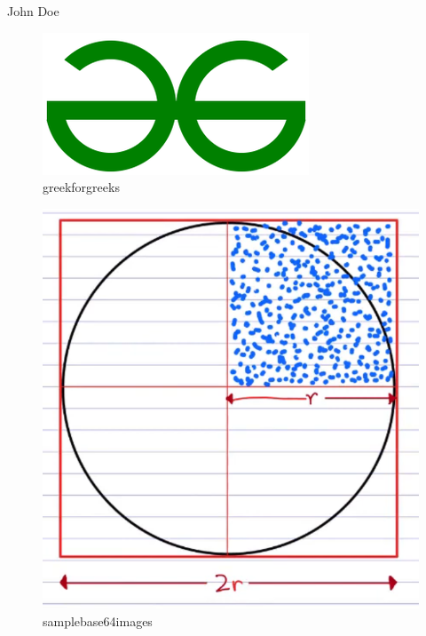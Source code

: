 \documentclass[journal,lettersize]{IEEEtran}%
\begin{document}
\begin{IEEEbiographynophoto}{John Doe}
    \begin{figure}[!t] 
    \centerline{\includegraphics[width=\linewidth]{image_1.png}}
    \caption{greekforgreeks}
    \label{fig:image_1.png}
    \end{figure}

    \begin{figure}[!t] 
    \centerline{\includegraphics[width=\linewidth]{image_5.jpeg}}
    \caption{samplebase64images}
    \label{fig:image_5.jpeg}
    \end{figure}


\end{IEEEbiographynophoto}
\end{document}
